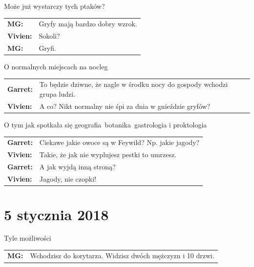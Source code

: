 \documentclass[10pt,twoside,twocolumn]{book}
\begin{document}
\begin{rpg-quotebox}{Może już wystarczy tych ptaków?}
   \begin{tabularx}{\columnwidth}{lX}
      \textbf{MG:} & Gryfy mają bardzo dobry wzrok.\\
      \textbf{Vivien:} & Sokoli?\\
      \textbf{MG:} & Gryfi.\\
   \end{tabularx}
\end{rpg-quotebox}

\begin{rpg-quotebox}{O normalnych miejscach na nocleg}
   \begin{tabularx}{\columnwidth}{lX}
      \textbf{Garret:} & To będzie dziwne, że nagle w środku nocy do gospody wchodzi grupa ludzi.\\
      \textbf{Vivien:} & A co? Nikt normalny nie śpi za dnia w gnieździe gryfów?\\
   \end{tabularx}
\end{rpg-quotebox}

\begin{rpg-quotebox}{O tym jak spotkała się geografia\, botanika\, gastrologia i proktologia}
   \begin{tabularx}{\columnwidth}{lX}
      \textbf{Garret:} & Ciekawe jakie owoce są w Feywild? Np. jakie jagody?\\
      \textbf{Vivien:} & Takie, że jak nie wyplujesz pestki to umrzesz.\\
      \textbf{Garret:} & A jak wyjdą inną stroną?\\
      \textbf{Vivien:} & Jagody, nie czopki!\\
   \end{tabularx}
\end{rpg-quotebox}

\section*{5 stycznia 2018}

\begin{rpg-quotebox}{Tyle możliwości}
   \begin{tabularx}{\columnwidth}{lX}
      \textbf{MG:} & Wchodzisz do korytarza. Widzisz dwóch mężczyzn i 10 drzwi.\\
   \end{tabularx}
\end{rpg-quotebox}
\end{document}
